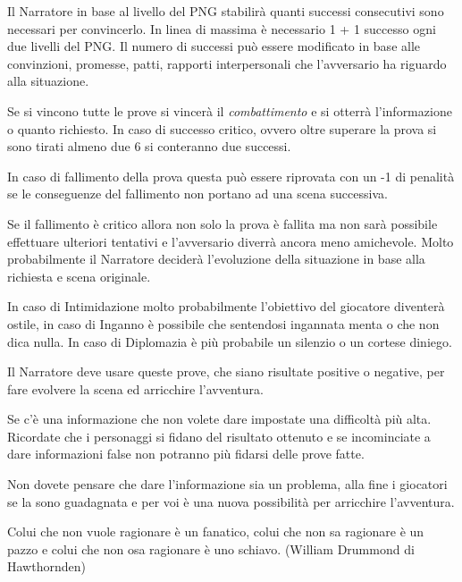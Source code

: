 \begin{multicols}{2}
Il Narratore in base al livello del PNG stabilirà quanti successi consecutivi sono necessari per convincerlo. In linea di massima è necessario 1 + 1 successo ogni due livelli del PNG. Il numero di successi può essere modificato in base alle convinzioni, promesse, patti, rapporti interpersonali che l'avversario ha riguardo alla situazione.

Se si vincono tutte le prove si vincerà il \emph{combattimento} e si otterrà l'informazione o quanto richiesto. In caso di successo critico, ovvero oltre superare la prova si sono tirati almeno due 6 si conteranno due successi.

In caso di fallimento della prova questa può essere riprovata con un -1 di penalità se le conseguenze del fallimento non portano ad una scena successiva.

\begin{figure}

\centering
\end{figure}

Se il fallimento è critico allora non solo la prova è fallita ma non sarà possibile effettuare ulteriori tentativi e l'avversario diverrà ancora meno amichevole. Molto probabilmente il Narratore deciderà l'evoluzione della situazione in base alla richiesta e scena originale.

In caso di Intimidazione molto probabilmente l'obiettivo del giocatore diventerà ostile, in caso di Inganno è possibile che sentendosi ingannata menta o che non dica nulla. In caso di Diplomazia è più probabile un silenzio o un cortese diniego.

Il Narratore deve usare queste prove, che siano risultate positive o negative, per fare evolvere la scena ed arricchire l'avventura.

Se c'è una informazione che non volete dare impostate una difficoltà più alta.
Ricordate che i personaggi si fidano del risultato ottenuto e se incominciate a dare informazioni false non potranno più fidarsi delle prove fatte.

Non dovete pensare che dare l'informazione sia un problema, alla fine i giocatori se la sono guadagnata e per voi è una nuova possibilità per arricchire l'avventura.

\end{multicols}

\vfill

\begin{changemargin}{0.3cm}{0.3cm}\begin{enfasi}{
Colui che non vuole ragionare è un fanatico, colui che non sa ragionare è un pazzo e colui che non osa ragionare è uno schiavo. (William Drummond di Hawthornden)
}\end{enfasi}\end{changemargin}

\pagebreak

